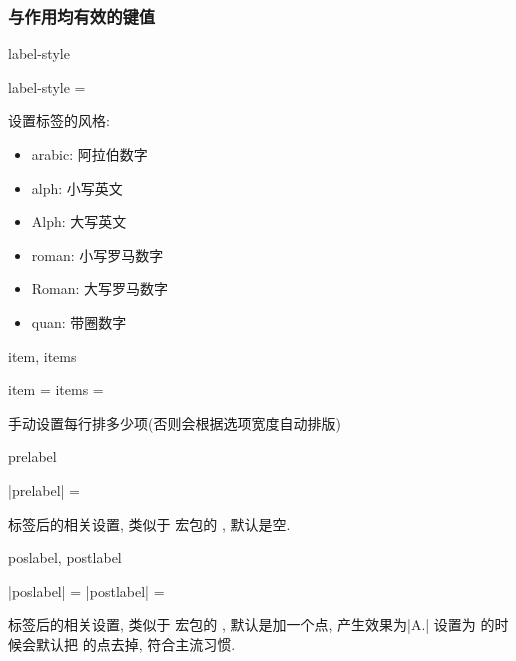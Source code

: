 \documentclass{l3doc}
\begin{document}
\begin{documentation}
\subsubsection{与作用均有效的键值}
\begin{function}{label-style}
	\begin{syntax}
		label-style =  
	\end{syntax}
	设置标签的风格: 
	\begin{itemize}
		\item arabic: 阿拉伯数字
		\item alph: 小写英文
		\item Alph: 大写英文
		\item roman: 小写罗马数字
		\item Roman: 大写罗马数字
		\item quan: 带圈数字
	\end{itemize}
\end{function}


\begin{function}{item, items}
	\begin{syntax}
		item = \meta{number}
		items = \meta{number}
	\end{syntax}
	手动设置每行排多少项(否则会根据选项宽度自动排版)
\end{function}

\begin{function}{prelabel}
	\begin{syntax}
		|prelabel| =  \init{{}}
	\end{syntax}
	标签后的相关设置, 类似于  宏包的 , 默认是空. 
\end{function}

\begin{function}[updated = 2021-12-24]{poslabel, postlabel}
	\begin{syntax}
		|poslabel| =  \init{{.}}
		|postlabel| =  \init{{.}}
	\end{syntax}
	标签后的相关设置, 类似于  宏包的 , 默认是加一个点, 产生效果为|A.|
	 设置为  的时候会默认把 的点去掉, 符合主流习惯.
\end{function}



\end{documentation}
\end{document}
